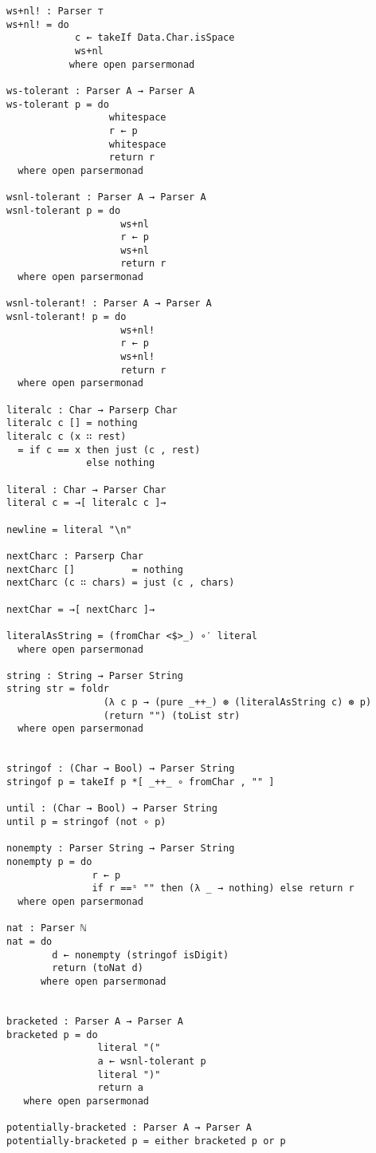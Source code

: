 \begin{appendices}
\begin{verbatim}
ws+nl! : Parser ⊤
ws+nl! = do
            c ← takeIf Data.Char.isSpace
            ws+nl
           where open parsermonad

ws-tolerant : Parser A → Parser A
ws-tolerant p = do
                  whitespace
                  r ← p
                  whitespace
                  return r
  where open parsermonad

wsnl-tolerant : Parser A → Parser A
wsnl-tolerant p = do
                    ws+nl
                    r ← p
                    ws+nl
                    return r
  where open parsermonad

wsnl-tolerant! : Parser A → Parser A
wsnl-tolerant! p = do
                    ws+nl!
                    r ← p
                    ws+nl!
                    return r
  where open parsermonad

literalc : Char → Parserp Char
literalc c [] = nothing
literalc c (x ∷ rest)
  = if c == x then just (c , rest)
              else nothing

literal : Char → Parser Char
literal c = →[ literalc c ]→

newline = literal "\n"

nextCharc : Parserp Char
nextCharc []          = nothing
nextCharc (c ∷ chars) = just (c , chars)

nextChar = →[ nextCharc ]→

literalAsString = (fromChar <$>_) ∘′ literal
  where open parsermonad

string : String → Parser String
string str = foldr
                 (λ c p → (pure _++_) ⊛ (literalAsString c) ⊛ p)
                 (return "") (toList str)
  where open parsermonad

  
stringof : (Char → Bool) → Parser String
stringof p = takeIf p *[ _++_ ∘ fromChar , "" ]

until : (Char → Bool) → Parser String
until p = stringof (not ∘ p)

nonempty : Parser String → Parser String
nonempty p = do
               r ← p
               if r ==ˢ "" then (λ _ → nothing) else return r
  where open parsermonad

nat : Parser ℕ
nat = do
        d ← nonempty (stringof isDigit)
        return (toNat d)
      where open parsermonad


bracketed : Parser A → Parser A
bracketed p = do
                literal "("
                a ← wsnl-tolerant p
                literal ")"
                return a
   where open parsermonad

potentially-bracketed : Parser A → Parser A
potentially-bracketed p = either bracketed p or p


\end{verbatim}
\end{appendices}
